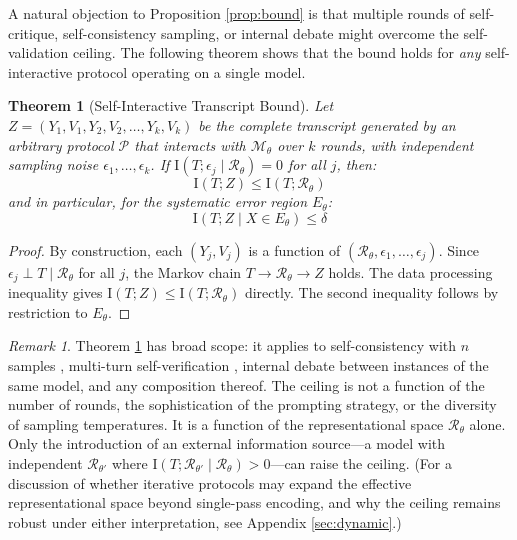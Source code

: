 \documentclass[11pt,a4paper]{article}
\newtheorem{theorem}{Theorem}[section]
\theoremstyle{remark}
\newtheorem{remark}{Remark}[section]
\newcommand{\MI}{\mathrm{I}}
\begin{document}
A natural objection to Proposition \ref{prop:bound} is that multiple rounds of self-critique, self-consistency sampling, or internal debate might overcome the self-validation ceiling. The following theorem shows that the bound holds for \emph{any} self-interactive protocol operating on a single model.

\begin{theorem}[Self-Interactive Transcript Bound]
\label{thm:transcript}
Let $Z = (Y_1, V_1, Y_2, V_2, \ldots, Y_k, V_k)$ be the complete transcript generated by an arbitrary protocol $\mathcal{P}$ that interacts with $\mathcal{M}_\theta$ over $k$ rounds, with independent sampling noise $\epsilon_1, \ldots, \epsilon_k$. If $\MI(T; \epsilon_j \mid \mathcal{R}_\theta) = 0$ for all $j$, then:
\begin{equation}
\label{eq:transcript}
  \MI(T; Z) \leq \MI(T; \mathcal{R}_\theta)
\end{equation}
and in particular, for the systematic error region $E_\theta$:
\begin{equation}
  \MI(T; Z \mid X \in E_\theta) \leq \delta
\end{equation}
\end{theorem}

\begin{proof}
By construction, each $(Y_j, V_j)$ is a function of $(\mathcal{R}_\theta, \epsilon_1, \ldots, \epsilon_j)$. Since $\epsilon_j \perp T \mid \mathcal{R}_\theta$ for all $j$, the Markov chain $T \to \mathcal{R}_\theta \to Z$ holds. The data processing inequality gives $\MI(T; Z) \leq \MI(T; \mathcal{R}_\theta)$ directly. The second inequality follows by restriction to $E_\theta$.
\end{proof}

\begin{remark}
Theorem \ref{thm:transcript} has broad scope: it applies to self-consistency with $n$ samples \cite{wang2023selfconsistency}, multi-turn self-verification \cite{weng2023verification}, internal debate between instances of the same model, and any composition thereof. The ceiling is not a function of the number of rounds, the sophistication of the prompting strategy, or the diversity of sampling temperatures. It is a function of the representational space $\mathcal{R}_\theta$ alone. Only the introduction of an external information source---a model with independent $\mathcal{R}_{\theta'}$ where $\MI(T; \mathcal{R}_{\theta'} \mid \mathcal{R}_\theta) > 0$---can raise the ceiling. (For a discussion of whether iterative protocols may expand the effective representational space beyond single-pass encoding, and why the ceiling remains robust under either interpretation, see Appendix \ref{sec:dynamic}.)
\end{remark}
\end{document}
